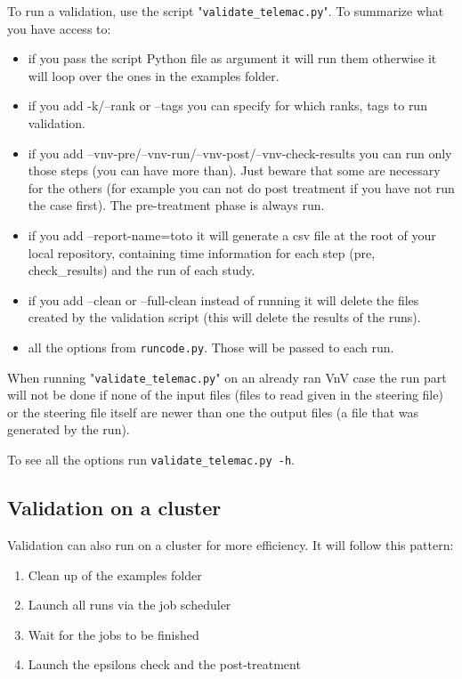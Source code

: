To run a validation, use the script "\verb!validate_telemac.py!".
To summarize what you have access to:
\begin{itemize}
\item if you pass the script Python file as argument it will run them otherwise
  it will loop over the ones in the examples folder.
\item if you add -k/--rank or --tags you can specify for which ranks, tags to
  run validation.
\item if you add --vnv-pre/--vnv-run/--vnv-post/--vnv-check-results you can run
only those steps (you can have more than). Just beware that some are necessary
for the others (for example you can not do post treatment if you have not run
the case first). The pre-treatment phase is always run.
\item if you add --report-name=toto it will generate a csv file at the root of
  your local \tel repository, containing time information for each step (pre,
  check\_results) and the run of each study.
\item if you add --clean or --full-clean instead of running it will delete the
  files created by the validation script (this will delete the results of the
  runs).
\item all the options from \verb!runcode.py!. Those will be passed to each run.
\end{itemize}

When running "\verb!validate_telemac.py!" on an already ran VnV case the run
part will not be done if none of the input files (files to read given in the
steering file) or the steering file itself are newer than one the output files
(a file that was generated by the run).

To see all the options run \verb!validate_telemac.py -h!.

\subsection{Validation on a cluster}

Validation can also run on a cluster for more efficiency.
It will follow this pattern:
\begin{enumerate}
  \item Clean up of the examples folder
  \item Launch all \tel runs via the job scheduler
  \item Wait for the jobs to be finished
  \item Launch the epsilons check and the post-treatment
\end{enumerate}

